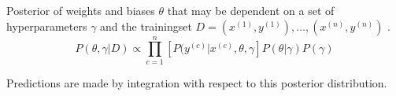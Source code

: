 \documentclass[11pt]{article}
\begin{document}




        Posterior of weights and biases $\theta$ that may be dependent on a set of hyperparameters $\gamma$ and the trainingset $D= (x^{(1)},y^{(1)}), \dots, (x^{(n)}, y^{(n)})$ .
         \begin{equation} \label{BNNPosterior1}
            P(\theta, \gamma| D) \propto \prod_{c=1}^n\left[P(y^{(c)}|x^{(c)}, \theta, \gamma \right] P(\theta|\gamma)P(\gamma)
        \end{equation}

        Predictions are made by integration with respect to this posterior distribution.
\end{document}
